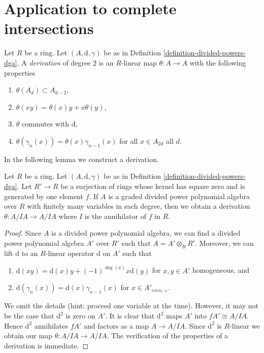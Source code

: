 \section{Application to complete intersections}
\label{section-application-ci}

\noindent
Let $R$ be a ring. Let $(A, \text{d}, \gamma)$ be as in
Definition \ref{definition-divided-powers-dga}.
A {\it derivation} of degree $2$ is an $R$-linear
map $\theta : A \to A$ with the following
properties
\begin{enumerate}
\item $\theta(A_d) \subset A_{d - 2}$,
\item $\theta(xy) = \theta(x)y + x\theta(y)$,
\item $\theta$ commutes with $\text{d}$,
\item $\theta(\gamma_n(x)) = \theta(x) \gamma_{n - 1}(x)$
for all $x \in A_{2d}$ all $d$.
\end{enumerate}
In the following lemma we construct a derivation.

\begin{lemma}
\label{lemma-get-derivation}
Let $R$ be a ring. Let $(A, \text{d}, \gamma)$ be as in
Definition \ref{definition-divided-powers-dga}.
Let $R' \to R$ be a surjection of rings whose kernel
has square zero and is generated by one element $f$.
If $A$ is a graded divided power polynomial algebra over $R$
with finitely many variables in each degree,
then we obtain a derivation
$\theta : A/IA \to A/IA$ where $I$ is the annihilator
of $f$ in $R$.
\end{lemma}

\begin{proof}
Since $A$ is a divided power polynomial algebra, we can find a divided
power polynomial algebra $A'$ over $R'$ such that $A = A' \otimes_R R'$.
Moreover, we can lift $\text{d}$ to an $R$-linear
operator $\text{d}$ on $A'$ such that
\begin{enumerate}
\item  $\text{d}(xy) = \text{d}(x)y + (-1)^{\deg(x)}x \text{d}(y)$
for $x, y \in A'$ homogeneous, and
\item  $\text{d}(\gamma_n(x)) = \text{d}(x) \gamma_{n - 1}(x)$ for
$x \in A'_{even, +}$.
\end{enumerate}
We omit the details (hint: proceed one variable at the time).
However, it may not be the case that $\text{d}^2$
is zero on $A'$. It is clear that $\text{d}^2$ maps $A'$ into
$fA' \cong A/IA$. Hence $\text{d}^2$ annihilates $fA'$ and factors
as a map $A \to A/IA$. Since $\text{d}^2$ is $R$-linear we obtain
our map $\theta : A/IA \to A/IA$. The verification of the properties
of a derivation is immediate.
\end{proof}

